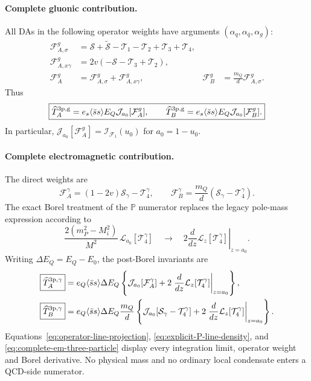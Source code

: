 \documentclass[11pt]{article}
\begin{document}
\paragraph{Complete gluonic contribution.}
All DAs in the following operator weights have arguments
$(\alpha_q,\alpha_{\bar q},\alpha_g)$:
\begin{align}
 \mathcal F^g_{A,\sigma}
 &=\mathcal S+\widetilde{\mathcal S}
   -\mathcal T_1-\mathcal T_2+\mathcal T_3+\mathcal T_4,\nonumber\\
 \mathcal F^g_{A,x\gamma}
 &=2v(-\mathcal S-\mathcal T_3+\mathcal T_2),\nonumber\\
 \mathcal F_A^g&=\mathcal F^g_{A,\sigma}
                 +\mathcal F^g_{A,x\gamma},&
 \mathcal F_B^g&=\frac{m_Q}{d}\mathcal F^g_{A,\sigma}.
 \label{eq:operator-weights-gluonic}
\end{align}
Thus
\begin{equation}
 \boxed{\widehat T_A^{\rm 3p,g}
 =e_s\langle\bar ss\rangle E_Q
 \mathcal J_{a_0}[\mathcal F_A^g],
 \qquad
 \widehat T_B^{\rm 3p,g}
 =e_s\langle\bar ss\rangle E_Q
 \mathcal J_{a_0}[\mathcal F_B^g].}
 \label{eq:complete-gluonic-three-particle}
\end{equation}
In particular,
$\mathcal J_{a_0}[\mathcal F_A^g]=\mathcal I_{\mathcal F_1}(u_0)$
for $a_0=1-u_0$.

\paragraph{Complete electromagnetic contribution.}
The direct weights are
\begin{equation}
 \mathcal F_A^\gamma=(1-2v)\mathcal S_\gamma-\mathcal T_4^\gamma,
 \qquad
 \mathcal F_B^\gamma=\frac{m_Q}{d}
 (\mathcal S_\gamma-\mathcal T_4^\gamma).
 \label{eq:operator-weights-em}
\end{equation}
The exact Borel treatment of the $\mathbb P$ numerator replaces the legacy
pole-mass expression according to
\begin{equation}
 \frac{2(m_P^2-M_i^2)}{M^2}\,
 \mathcal L_{a_0}[\mathcal T_4^\gamma]
 \quad\longrightarrow\quad
 2\left.\frac{d}{dz}\mathcal L_z[\mathcal T_4^\gamma]\right|_{z=a_0}.
 \label{eq:P-functional-borel-replacement}
\end{equation}
Writing $\Delta E_Q=E_Q-E_0$, the post-Borel invariants are
\begin{align}
 \boxed{\widehat T_A^{\rm 3p,\gamma}}
 &=e_Q\langle\bar ss\rangle\Delta E_Q
 \left\{\mathcal J_{a_0}[\mathcal F_A^\gamma]
 +2\left.\frac{d}{dz}\mathcal L_z[\mathcal T_4^\gamma]
 \right|_{z=a_0}\right\},
 \nonumber\\
 \boxed{\widehat T_B^{\rm 3p,\gamma}}
 &=e_Q\langle\bar ss\rangle\Delta E_Q\frac{m_Q}{d}
 \left\{\mathcal J_{a_0}[
 \mathcal S_\gamma-\mathcal T_4^\gamma]
 +2\left.\frac{d}{dz}\mathcal L_z[\mathcal T_4^\gamma]
 \right|_{z=a_0}\right\}.
 \label{eq:complete-em-three-particle}
\end{align}
Equations~\eqref{eq:operator-line-projection},
\eqref{eq:explicit-P-line-density}, and
\eqref{eq:complete-em-three-particle} display every integration limit,
operator weight and Borel derivative.  No physical mass and no ordinary local
condensate enters a QCD-side numerator.
\end{document}
